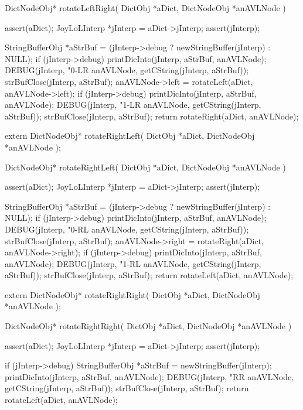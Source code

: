 \startCCode
DictNodeObj* rotateLeftRight(
  DictObj     *aDict,
  DictNodeObj *anAVLNode
) {
  assert(aDict);
  JoyLoLInterp *jInterp = aDict->jInterp;
  assert(jInterp);
  
  StringBufferObj *aStrBuf =
    (jInterp->debug ? newStringBuffer(jInterp) : NULL);
  if (jInterp->debug) {
    printDicInto(jInterp, aStrBuf, anAVLNode);
    DEBUG(jInterp, "0-LR %
      anAVLNode, getCString(jInterp, aStrBuf));
    strBufClose(jInterp, aStrBuf);
  }
  anAVLNode->left = rotateLeft(aDict, anAVLNode->left);
  if (jInterp->debug) {
    printDicInto(jInterp, aStrBuf, anAVLNode);
    DEBUG(jInterp, "1-LR %
      anAVLNode, getCString(jInterp, aStrBuf));
    strBufClose(jInterp, aStrBuf);
  }
  return rotateRight(aDict, anAVLNode);
}
\stopCCode

\startCHeader
extern DictNodeObj* rotateRightLeft(
  DictObj     *aDict,
  DictNodeObj *anAVLNode
);
\stopCHeader

\startCCode
DictNodeObj* rotateRightLeft(
  DictObj     *aDict,
  DictNodeObj *anAVLNode
) {
  assert(aDict);
  JoyLoLInterp *jInterp = aDict->jInterp;
  assert(jInterp);
  
  StringBufferObj *aStrBuf =
    (jInterp->debug ? newStringBuffer(jInterp) : NULL);
  if (jInterp->debug) {
    printDicInto(jInterp, aStrBuf, anAVLNode);
    DEBUG(jInterp, "0-RL %
      anAVLNode, getCString(jInterp, aStrBuf));
    strBufClose(jInterp, aStrBuf);
  }
  anAVLNode->right = rotateRight(aDict, anAVLNode->right);
  if (jInterp->debug) {
    printDicInto(jInterp, aStrBuf, anAVLNode);
    DEBUG(jInterp, "1-RL %
      anAVLNode, getCString(jInterp, aStrBuf));
    strBufClose(jInterp, aStrBuf);
  }
  return rotateLeft(aDict, anAVLNode);
}
\stopCCode

\startCHeader
extern DictNodeObj* rotateRightRight(
  DictObj     *aDict,
  DictNodeObj *anAVLNode
);
\stopCHeader

\startCCode
DictNodeObj* rotateRightRight(
  DictObj     *aDict,
  DictNodeObj *anAVLNode
) {
  assert(aDict);
  JoyLoLInterp *jInterp = aDict->jInterp;
  assert(jInterp);
  
  if (jInterp->debug) {
    StringBufferObj *aStrBuf = newStringBuffer(jInterp);
    printDicInto(jInterp, aStrBuf, anAVLNode);
    DEBUG(jInterp, "RR %
      anAVLNode, getCString(jInterp, aStrBuf));
    strBufClose(jInterp, aStrBuf);
  }
  return rotateLeft(aDict, anAVLNode);
}
\stopCCode


